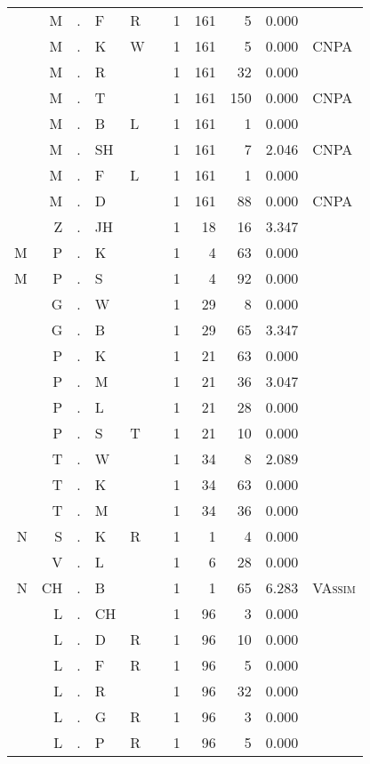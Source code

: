 \begin{longtable}{r@{ } r@{ } c@{ } l@{ } l@{ } l@{ } r r r r l }
 & M & . & F & R &  & 1 & 161 & 5 & 0.000 &  \\
 & M & . & K & W &  & 1 & 161 & 5 & 0.000 & \textsc{CNPA} \\
 & M & . & R &  &  & 1 & 161 & 32 & 0.000 &  \\
 & M & . & T &  &  & 1 & 161 & 150 & 0.000 & \textsc{CNPA} \\
 & M & . & B & L &  & 1 & 161 & 1 & 0.000 &  \\
 & M & . & SH &  &  & 1 & 161 & 7 & 2.046 & \textsc{CNPA} \\
 & M & . & F & L &  & 1 & 161 & 1 & 0.000 &  \\
 & M & . & D &  &  & 1 & 161 & 88 & 0.000 & \textsc{CNPA} \\
 & Z & . & JH &  &  & 1 & 18 & 16 & 3.347 &  \\
M & P & . & K &  &  & 1 & 4 & 63 & 0.000 &  \\
M & P & . & S &  &  & 1 & 4 & 92 & 0.000 &  \\
 & G & . & W &  &  & 1 & 29 & 8 & 0.000 &  \\
 & G & . & B &  &  & 1 & 29 & 65 & 3.347 &  \\
 & P & . & K &  &  & 1 & 21 & 63 & 0.000 &  \\
 & P & . & M &  &  & 1 & 21 & 36 & 3.047 &  \\
 & P & . & L &  &  & 1 & 21 & 28 & 0.000 &  \\
 & P & . & S & T &  & 1 & 21 & 10 & 0.000 &  \\
 & T & . & W &  &  & 1 & 34 & 8 & 2.089 &  \\
 & T & . & K &  &  & 1 & 34 & 63 & 0.000 &  \\
 & T & . & M &  &  & 1 & 34 & 36 & 0.000 &  \\
N & S & . & K & R &  & 1 & 1 & 4 & 0.000 &  \\
 & V & . & L &  &  & 1 & 6 & 28 & 0.000 &  \\
N & CH & . & B &  &  & 1 & 1 & 65 & 6.283 & \textsc{VAssim} \\
 & L & . & CH &  &  & 1 & 96 & 3 & 0.000 &  \\
 & L & . & D & R &  & 1 & 96 & 10 & 0.000 &  \\
 & L & . & F & R &  & 1 & 96 & 5 & 0.000 &  \\
 & L & . & R &  &  & 1 & 96 & 32 & 0.000 &  \\
 & L & . & G & R &  & 1 & 96 & 3 & 0.000 &  \\
 & L & . & P & R &  & 1 & 96 & 5 & 0.000 &  \\

\end{longtable}
